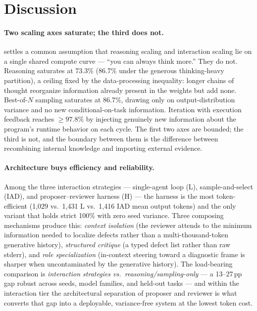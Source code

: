 \section{Discussion}
\label{sec:discussion}

\paragraph{Two scaling axes saturate; the third does not.}  settles a common assumption that reasoning scaling and interaction scaling lie on a single shared compute curve --- ``you can always think more.'' They do not. Reasoning saturates at 73.3\% (86.7\% under the generous thinking-heavy partition), a ceiling fixed by the data-processing inequality: longer chains of thought reorganize information already present in the weights but add none. Best-of-$N$ sampling saturates at 86.7\%, drawing only on output-distribution variance and no new conditional-on-task information. Iteration with execution feedback reaches $\geq 97.8\%$ by injecting genuinely new information about the program's runtime behavior on each cycle. The first two axes are bounded; the third is not, and the boundary between them is the difference between recombining internal knowledge and importing external evidence.

\paragraph{Architecture buys efficiency and reliability.} Among the three interaction strategies --- single-agent loop (L), sample-and-select (IAD), and proposer--reviewer harness (H) --- the harness is the most token-efficient (1{,}029 vs.\ 1{,}431 L vs.\ 1{,}416 IAD mean output tokens) and the only variant that holds strict 100\% with zero seed variance. Three composing mechanisms produce this: \emph{context isolation} (the reviewer attends to the minimum information needed to localize defects rather than a multi-thousand-token generative history), \emph{structured critique} (a typed defect list rather than raw stderr), and \emph{role specialization} (in-context steering toward a diagnostic frame is sharper when uncontaminated by the generative history). The load-bearing comparison is \emph{interaction strategies vs.\ reasoning/sampling-only} --- a 13--27\,pp gap robust across seeds, model families, and held-out tasks --- and within the interaction tier the architectural separation of proposer and reviewer is what converts that gap into a deployable, variance-free system at the lowest token cost.

